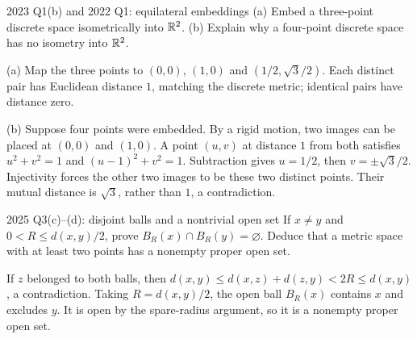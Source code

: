 \begin{exam}{2023 Q1(b) and 2022 Q1: equilateral embeddings}
(a) Embed a three-point discrete space isometrically into $\mathbb R^2$. (b) Explain why a four-point discrete space has no isometry into $\mathbb R^2$.
\end{exam}
\begin{answer}
(a) Map the three points to $(0,0)$, $(1,0)$ and $(1/2,\sqrt3/2)$. Each distinct pair has Euclidean distance $1$, matching the discrete metric; identical pairs have distance zero.

(b) Suppose four points were embedded. By a rigid motion, two images can be placed at $(0,0)$ and $(1,0)$. A point $(u,v)$ at distance $1$ from both satisfies $u^2+v^2=1$ and $(u-1)^2+v^2=1$. Subtraction gives $u=1/2$, then $v=\pm\sqrt3/2$. Injectivity forces the other two images to be these two distinct points. Their mutual distance is $\sqrt3$, rather than $1$, a contradiction.
\end{answer}
\begin{exam}{2025 Q3(c)--(d): disjoint balls and a nontrivial open set}
If $x\ne y$ and $0<R\le d(x,y)/2$, prove $B_R(x)\cap B_R(y)=\varnothing$. Deduce that a metric space with at least two points has a nonempty proper open set.
\end{exam}
\begin{answer}
If $z$ belonged to both balls, then $d(x,y)\le d(x,z)+d(z,y)<2R\le d(x,y)$, a contradiction. Taking $R=d(x,y)/2$, the open ball $B_R(x)$ contains $x$ and excludes $y$. It is open by the spare-radius argument, so it is a nonempty proper open set.
\end{answer}


